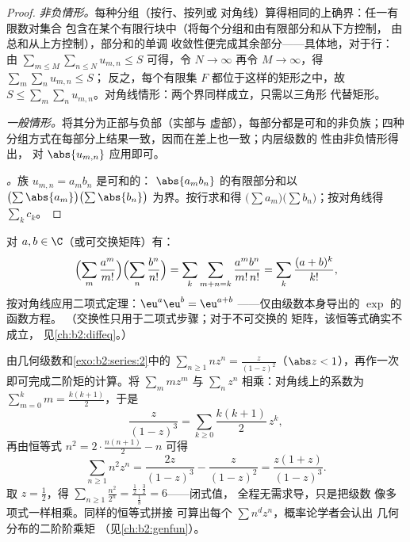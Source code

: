 \begin{proof}
\emph{非负情形。}每种分组（按行、按列或
对角线）算得相同的上确界：任一有限数对集合
包含在某个有限行块中（将每个分组和由有限部分和从下方控制，
由总和从上方控制），部分和的单调
收敛性便完成其余部分——具体地，对于行：
由 $\sum_{m \leq M}\sum_{n \leq N} u_{m,n} \leq S$ 可得，令 $N
\to \infty$ 再令 $M \to \infty$，得 $\sum_m \sum_n u_{m,n} \leq S$；
反之，每个有限集 $F$ 都位于这样的矩形之中，故 $S \leq
\sum_m\sum_n u_{m,n}$。对角线情形：两个界同样成立，只需以三角形
代替矩形。

\emph{一般情形。}将其分为正部与负部（实部与
虚部），每部分都是可和的非负族；四种
分组方式在每部分上结果一致，因而在差上也一致；内层级数的
性由非负情形得出，
对 $\abs{u_{m,n}}$ 应用即可。

\emph{。}族 $u_{m,n} = a_m b_n$ 是可和的：
$\abs{a_mb_n}$ 的有限部分和以
$\bigl(\sum\abs{a_m}\bigr)\bigl(\sum\abs{b_n}\bigr)$ 为界。按行求和得
$\bigl(\sum a_m\bigr)\bigl(\sum b_n\bigr)$；按对角线得 $\sum_k
c_k$。
\end{proof}

\begin{example}[指数恒等式的严格处理]\label{ex:b2:series:exp}
对 $a, b \in \C$（或可交换矩阵）有：
\[
\Bigl(\sum_m \frac{a^m}{m!}\Bigr)\Bigl(\sum_n
\frac{b^n}{n!}\Bigr)
= \sum_k \sum_{m+n=k} \frac{a^m b^n}{m!\,n!}
= \sum_k \frac{(a + b)^k}{k!},
\]
按对角线应用二项式定理：$\eu^a \eu^b = \eu^{a+b}$
——仅由级数本身导出的 $\exp$ 的函数方程。
（交换性只用于二项式步骤；对于不可交换的
矩阵，该恒等式确实不成立，
见\cref{ch:b2:diffeq}。）
\end{example}

\begin{example}[作为计算工具的柯西乘积]\label{ex:b2:series:squaresum}
由几何级数和\cref{exo:b2:series:2}中的 $\sum_{n
\geq 1} nz^n = \frac{z}{(1-z)^2}$（$\abs z < 1$），再作一次
即可完成二阶矩的计算。将 $\sum_m
mz^m$ 与 $\sum_n z^n$ 相乘：对角线上的系数为 $\sum_{m=0}^k
m = \frac{k(k+1)}2$，于是
\[
\frac{z}{(1-z)^3} = \sum_{k\geq0}\frac{k(k+1)}{2}\,z^k ,
\]
再由恒等式 $n^2 = 2\cdot\frac{n(n+1)}2 - n$ 可得
\[
\sum_{n\geq1} n^2z^n = \frac{2z}{(1-z)^3} - \frac{z}{(1-z)^2}
= \frac{z(1+z)}{(1-z)^3} .
\]
取 $z = \frac12$，得 $\sum_{n\geq1}\frac{n^2}{2^n} =
\frac{\frac12\cdot\frac32}{\frac18} = 6$——闭式值，
全程无需求导，只是把级数
像多项式一样相乘。同样的恒等式拼接
可算出每个 $\sum n^dz^n$，概率论学者会认出
几何分布的二阶阶乘矩
（见\cref{ch:b2:genfun}）。
\end{example}

